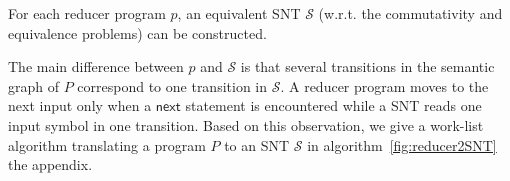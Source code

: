 \documentclass[runningheads,a4paper]{llncs}
\def\Ss{{\mathcal{S} }}
\newcommand\cur{\mathsf{cur}}
\newcommand\next{\mathsf{next}}
\newcommand\vars{\mathsf{vars}}
\newcommand\dom{\mathsf{dom}}
\newcommand\defval{\mathsf{DEF}}
\begin{document}
\begin{proposition}\label{prop-mrprog-to-snt}
For each reducer program $p$, an equivalent SNT $\Ss$ (w.r.t. the commutativity and equivalence problems) can be constructed.
\end{proposition}

The main difference between $p$ and $\Ss$ is that several transitions in the semantic graph of $P$ correspond to one transition in $\Ss$. A reducer program moves to the next input only when a $\next$ statement is encountered while a SNT reads one input symbol in one transition. Based on this observation, we give a work-list algorithm translating a program $P$ to an SNT $\Ss$ in algorithm~\ref{fig:reducer2SNT} the appendix.





%
%
%
\end{document}
